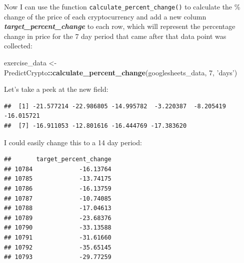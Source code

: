 \documentclass[
]{book}
\newenvironment{Shaded}{\begin{snugshade}}{\end{snugshade}}
\newcommand{\DecValTok}[1]{\textcolor[rgb]{0.00,0.00,0.81}{#1}}
\newcommand{\KeywordTok}[1]{\textcolor[rgb]{0.13,0.29,0.53}{\textbf{#1}}}
\newcommand{\NormalTok}[1]{#1}
\newcommand{\OperatorTok}[1]{\textcolor[rgb]{0.81,0.36,0.00}{\textbf{#1}}}
\newcommand{\StringTok}[1]{\textcolor[rgb]{0.31,0.60,0.02}{#1}}
\begin{document}
Now I can use the function \texttt{calculate\_percent\_change()} to calculate the \% change of the price of each cryptocurrency and add a new column \textbf{\emph{target\_percent\_change}} to each row, which will represent the percentage change in price for the 7 day period that came after that data point was collected:

\begin{Shaded}
\begin{Highlighting}[]
\NormalTok{exercise_data <-}\StringTok{ }\NormalTok{PredictCrypto}\OperatorTok{::}\KeywordTok{calculate_percent_change}\NormalTok{(googlesheets_data, }\DecValTok{7}\NormalTok{, }\StringTok{'days'}\NormalTok{)}
\end{Highlighting}
\end{Shaded}

Let's take a peek at the new field:

\begin{Shaded}
\end{Shaded}

\begin{verbatim}
##  [1] -21.577214 -22.986805 -14.995782  -3.220387  -8.205419 -16.015721
##  [7] -16.911053 -12.801616 -16.444769 -17.383620
\end{verbatim}

I could easily change this to a 14 day period:

\begin{Shaded}
\end{Shaded}

\begin{verbatim}
##       target_percent_change
## 10784             -16.13764
## 10785             -13.74175
## 10786             -16.13759
## 10787             -10.74085
## 10788             -17.04613
## 10789             -23.68376
## 10790             -33.13588
## 10791             -31.61660
## 10792             -35.65145
## 10793             -29.77259
\end{verbatim}
\end{document}
